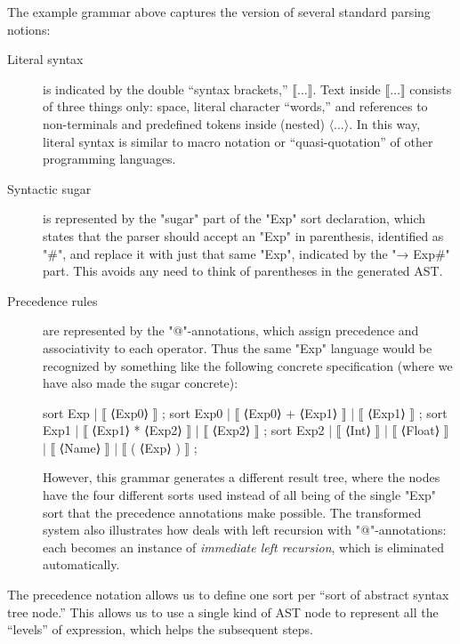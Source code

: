 \documentclass[11pt]{article} %
\begin{document}
The example grammar above captures the \HAX version of several standard parsing notions:
\begin{description}

\item[Literal syntax] is indicated by the double ``syntax brackets,'' $⟦…⟧$.  Text inside $⟦…⟧$
  consists of three things only: space, literal character ``words,'' and references to non-terminals
  and predefined tokens inside (nested) $⟨…⟩$.  In this way, literal syntax is similar to macro
  notation or ``quasi-quotation'' of other programming languages.

\item[Syntactic sugar] is represented by the "sugar" part of the "Exp" sort declaration, which
  states that the parser should accept an "Exp" in parenthesis, identified as "#", and replace it
  with just that same "Exp", indicated by the "→ Exp#" part.  This avoids any need to think of
  parentheses in the generated AST.

\item[Precedence rules] are represented by the "@"-annotations, which assign precedence and
  associativity to each operator. Thus the same "Exp" language would be recognized by
  something like the following concrete \HAX specification (where we have also made the sugar
  concrete):
\begin{hacs}[xleftmargin=\parindent]
sort Exp   | ⟦ ⟨Exp0⟩ ⟧ ;
sort Exp0  | ⟦ ⟨Exp0⟩ + ⟨Exp1⟩ ⟧ | ⟦ ⟨Exp1⟩ ⟧ ;
sort Exp1  | ⟦ ⟨Exp1⟩ * ⟨Exp2⟩ ⟧ | ⟦ ⟨Exp2⟩ ⟧ ;
sort Exp2  | ⟦ ⟨Int⟩ ⟧ | ⟦ ⟨Float⟩ ⟧ | ⟦ ⟨Name⟩ ⟧ | ⟦ ( ⟨Exp⟩ ) ⟧ ;
\end{hacs}%
  However, this grammar generates a different result tree, where the nodes have the four
  different sorts used instead of all being of the single "Exp" sort that the precedence
  annotations make possible.  The transformed system also illustrates how \HAX deals with left
  recursion with "@"-annotations: each becomes an instance of \emph{immediate left recursion},
  which is eliminated automatically.

\end{description}
The precedence notation allows us to define one sort per ``sort of abstract syntax tree node.''
This allows us to use a single kind of AST node to represent all the ``levels'' of expression, which
helps the subsequent steps.
\end{document}
